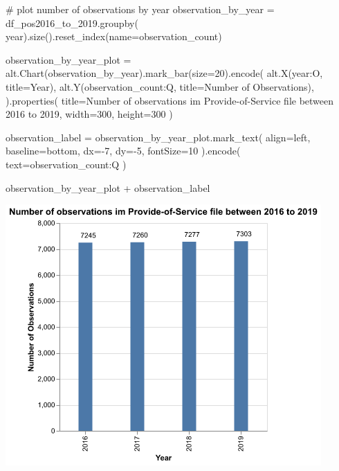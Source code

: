 \documentclass[
  letterpaper,
  DIV=11,
  numbers=noendperiod]{scrartcl}
\newenvironment{Shaded}{\begin{snugshade}}{\end{snugshade}}
\newcommand{\CommentTok}[1]{\textcolor[rgb]{0.37,0.37,0.37}{#1}}
\newcommand{\DecValTok}[1]{\textcolor[rgb]{0.68,0.00,0.00}{#1}}
\newcommand{\NormalTok}[1]{\textcolor[rgb]{0.00,0.23,0.31}{#1}}
\newcommand{\OperatorTok}[1]{\textcolor[rgb]{0.37,0.37,0.37}{#1}}
\newcommand{\StringTok}[1]{\textcolor[rgb]{0.13,0.47,0.30}{#1}}
\begin{document}
\begin{Shaded}
\begin{Highlighting}[]
\CommentTok{\# plot number of observations by year}
\NormalTok{observation\_by\_year }\OperatorTok{=}\NormalTok{ df\_pos2016\_to\_2019.groupby(}
    \StringTok{\textquotesingle{}year\textquotesingle{}}\NormalTok{).size().reset\_index(name}\OperatorTok{=}\StringTok{\textquotesingle{}observation\_count\textquotesingle{}}\NormalTok{)}

\NormalTok{observation\_by\_year\_plot }\OperatorTok{=}\NormalTok{ alt.Chart(observation\_by\_year).mark\_bar(size}\OperatorTok{=}\DecValTok{20}\NormalTok{).encode(}
\NormalTok{    alt.X(}\StringTok{\textquotesingle{}year:O\textquotesingle{}}\NormalTok{, title}\OperatorTok{=}\StringTok{\textquotesingle{}Year\textquotesingle{}}\NormalTok{),}
\NormalTok{    alt.Y(}\StringTok{\textquotesingle{}observation\_count:Q\textquotesingle{}}\NormalTok{, title}\OperatorTok{=}\StringTok{\textquotesingle{}Number of Observations\textquotesingle{}}\NormalTok{),}
\NormalTok{).properties(}
\NormalTok{    title}\OperatorTok{=}\StringTok{\textquotesingle{}Number of observations im Provide{-}of{-}Service file between 2016 to 2019\textquotesingle{}}\NormalTok{,}
\NormalTok{    width}\OperatorTok{=}\DecValTok{300}\NormalTok{,}
\NormalTok{    height}\OperatorTok{=}\DecValTok{300}
\NormalTok{)}

\NormalTok{observation\_label }\OperatorTok{=}\NormalTok{ observation\_by\_year\_plot.mark\_text(}
\NormalTok{    align}\OperatorTok{=}\StringTok{\textquotesingle{}left\textquotesingle{}}\NormalTok{,}
\NormalTok{    baseline}\OperatorTok{=}\StringTok{\textquotesingle{}bottom\textquotesingle{}}\NormalTok{,}
\NormalTok{    dx}\OperatorTok{={-}}\DecValTok{7}\NormalTok{,}
\NormalTok{    dy}\OperatorTok{={-}}\DecValTok{5}\NormalTok{,}
\NormalTok{    fontSize}\OperatorTok{=}\DecValTok{10}
\NormalTok{).encode(}
\NormalTok{    text}\OperatorTok{=}\StringTok{\textquotesingle{}observation\_count:Q\textquotesingle{}}
\NormalTok{)}

\NormalTok{observation\_by\_year\_plot }\OperatorTok{+}\NormalTok{ observation\_label}
\end{Highlighting}
\end{Shaded}

\includegraphics[width=4.75in,height=3.92708in]{pset4_template_files/figure-pdf/cell-5-output-1.png}
\end{document}
